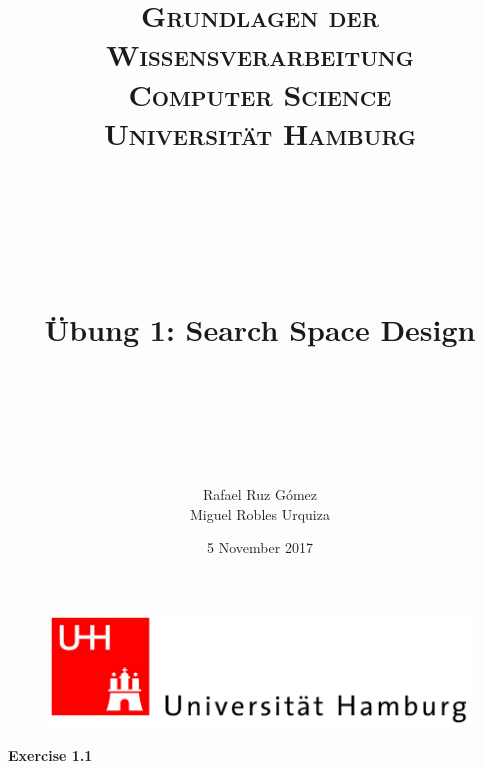\documentclass[paper=a4, fontsize=11pt]{scrartcl} %
\title{	
\normalfont \normalsize 
\textsc{\textbf{Grundlagen der Wissensverarbeitung} \\ Computer Science \\ Universität Hamburg} \\ [25pt] %
~\\
~\\
~\\
\horrule{0.5pt} \\[0.4cm] %
\Huge Übung 1: Search Space Design \\ %
\horrule{2pt} \\[0.5cm] %
~\\
~\\
}
\author{Rafael Ruz Gómez\\Miguel Robles Urquiza} %
\date{\normalsize 5 November 2017} %
\numberwithin{equation}{section} %
\numberwithin{figure}{section} %
\numberwithin{table}{section} %
\begin{document}
\maketitle %

\begin{figure}
	\centering
	\includegraphics[scale=0.8]{logo_uni_hamburg.png}
\end{figure}

\newpage %





\huge{ \textbf{Exercise 1.1}}\\
\end{document}
